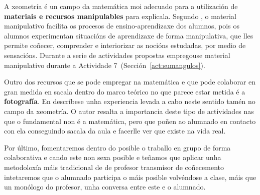 A xeometría é un campo da matemática moi adecuado para a utilización de \textbf{materiais e recursos manipulables} para explicala. Segundo ,  o material manipulativo facilita os procesos de ensino-aprendizaxe dos alumnos, pois os alumnos experimentan situacións de aprendizaxe de forma manipulativa, que lles permite coñecer, comprender e interiorizar as nocións estudadas, por medio de sensacións. Durante a serie de actividades propostas empregouse material manipulativo durante a Actividade 7~(Sección~\ref{act:sumangulos}).

Outro dos recursos que se pode empregar na matemática e que pode colaborar en gran medida en sacala dentro do marco teórico no que parece estar metida é a \textbf{fotografía}. En  descríbese unha experiencia levada a cabo neste sentido tamén no campo da xeometría. O autor resalta a importancia deste tipo de actividades nas que o fundamental non é a matemática, pero que poñen ao alumnado en contacto con ela conseguindo sacala da aula e facerlle ver que existe na vida real.

Por último, fomentaremos dentro do posible o traballo en grupo de forma colaborativa e cando este non sexa posible e teñamos que aplicar unha metodoloxía máis tradicional de de profesor transmisor de coñecemento intetaremos que o alumnado participa o máis posible volvéndose a clase, máis que un monólogo do profesor, unha conversa entre este e o alumnado.
